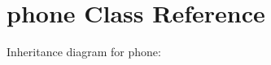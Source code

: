 \hypertarget{classphone}{}\section{phone Class Reference}
\label{classphone}


Inheritance diagram for phone\+:
